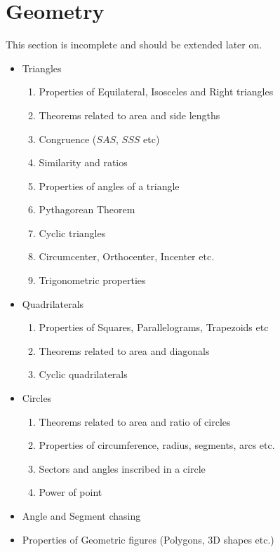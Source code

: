 \documentclass[oneside]{book}
\begin{document}
 \section{Geometry}
This section is incomplete and should be extended later on.
 \begin{itemize}
     \item Triangles
        \begin{enumerate}
            \item Properties of Equilateral, Isosceles and Right triangles
            \item Theorems related to area and side lengths
            \item Congruence ($SAS$, $SSS$ etc)
            \item Similarity and ratios
            \item Properties of angles of a triangle
            \item Pythagorean Theorem
            \item Cyclic triangles
            \item Circumcenter, Orthocenter, Incenter etc.
            \item Trigonometric properties
        \end{enumerate}
    \item Quadrilaterals
        \begin{enumerate}
            \item Properties of Squares, Parallelograms, Trapezoids etc
            \item Theorems related to area and diagonals
            \item Cyclic quadrilaterals
        \end{enumerate}
    \item Circles
        \begin{enumerate}
            \item Theorems related to area and ratio of circles
            \item Properties of circumference, radius, segments, arcs etc.
            \item Sectors and angles inscribed in a circle
            \item Power of point
        \end{enumerate}
    \item Angle and Segment chasing
    \item Properties of Geometric figures (Polygons, 3D shapes etc.)
 \end{itemize}
 
\end{document}
